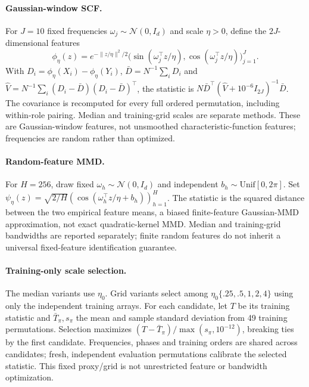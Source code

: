 {\paragraph{Gaussian-window SCF.}
For $J=10$ fixed frequencies $\omega_j\sim\mathcal N(0,I_d)$ and scale
$\eta>0$, define the $2J$-dimensional features
\[
 \phi_\eta(z)=e^{-\|z/\eta\|^2/2}
 \bigl(\sin(\omega_j^\top z/\eta),\cos(\omega_j^\top z/\eta)\bigr)_{j=1}^{J}.
\]
With $D_i=\phi_\eta(X_i)-\phi_\eta(Y_i)$,
$\bar D=N^{-1}\sum_iD_i$ and
$\widehat V=N^{-1}\sum_i(D_i-\bar D)(D_i-\bar D)^\top$, the statistic is
$N\bar D^\top(\widehat V+10^{-6}I_{2J})^{-1}\bar D$.
The covariance is recomputed for every full ordered permutation, including
within-role pairing. Median and training-grid scales are separate methods.
These are Gaussian-window features, not unsmoothed characteristic-function features; frequencies are random rather than optimized.

\paragraph{Random-feature MMD.}
For $H=256$, draw fixed $\omega_h\sim\mathcal N(0,I_d)$ and independent
$b_h\sim\mathrm{Unif}[0,2\pi]$. Set
$\psi_\eta(z)=\sqrt{2/H}(\cos(\omega_h^\top z/\eta+b_h))_{h=1}^{H}$.
The statistic is the squared distance between the two empirical feature means,
a biased finite-feature Gaussian-MMD approximation, not exact quadratic-kernel
MMD. Median and training-grid bandwidths are reported separately; finite random
features do not inherit a universal fixed-feature identification guarantee.

\paragraph{Training-only scale selection.}
The median variants use $\eta_0$. Grid variants select among
$\eta_0\{.25,.5,1,2,4\}$ using only the independent training arrays.
For each candidate, let $T$ be its training statistic and $\bar T_\pi,s_\pi$
the mean and sample standard deviation from 49 training permutations.
Selection maximizes $(T-\bar T_\pi)/\max(s_\pi,10^{-12})$, breaking ties by
the first candidate. Frequencies, phases and training orders are shared across
candidates; fresh, independent evaluation permutations calibrate the selected
statistic. This fixed proxy/grid is not unrestricted feature or bandwidth
optimization.

}
